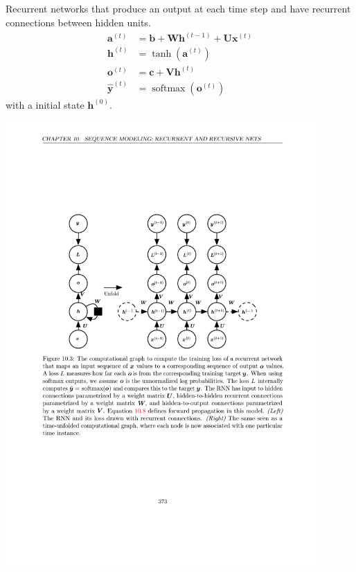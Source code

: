 \documentclass[12pt, a4paper]{article}
\def\vb{\boldsymbol{b}}
\def\vc{\boldsymbol{c}}
\def\vU{\boldsymbol{U}}
\def\vV{\boldsymbol{V}}
\def\vW{\boldsymbol{W}}
\DeclareMathOperator*{\softmax}{softmax}
\newcommand{\egva}[1]{\boldsymbol{a}^{(#1)}}
\newcommand{\egvh}[1]{\boldsymbol{h}^{(#1)}}
\newcommand{\egvo}[1]{\boldsymbol{o}^{(#1)}}
\newcommand{\egvx}[1]{\boldsymbol{x}^{(#1)}}
\newcommand{\eghvy}[1]{\hat{\boldsymbol{y}}^{(#1)}}
\begin{document}
\subsection{}
Recurrent networks that produce an output at each time step and have recurrent connections between hidden units.
\begin{equation}
    \begin{split}
        \egva{t} &= \vb + \vW\egvh{t-1} + \vU\egvx{t} \\
        \egvh{t} &= \tanh(\egva{t}) \\
        \egvo{t} &= \vc + \vV\egvh{t} \\
        \eghvy{t} &= \softmax(\egvo{t})
    \end{split}
    \label{rnn_for}
\end{equation}
with a initial state $\egvh{0}$.
\begin{center}
    \includegraphics[width=0.9\textwidth]{../imgs/RNN_1.pdf} 
\end{center}
\end{document}
